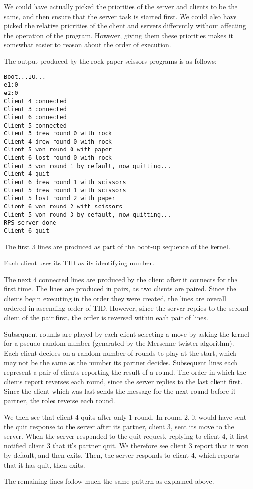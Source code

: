 \documentclass[titlepage]{article}
\begin{document}
We could have actually picked the priorities of the server and clients to be the
same, and then ensure that the server task is started first.
We could also have picked the relative priorities of the client and servers differently
without affecting the operation of the program.
However, giving them these priorities makes it somewhat easier to reason about
the order of execution.

The output produced by the rock-paper-scissors programs is as follows:

\begin{verbatim}
Boot...IO...
e1:0
e2:0
Client 4 connected
Client 3 connected
Client 6 connected
Client 5 connected
Client 3 drew round 0 with rock
Client 4 drew round 0 with rock
Client 5 won round 0 with paper
Client 6 lost round 0 with rock
Client 3 won round 1 by default, now quitting...
Client 4 quit
Client 6 drew round 1 with scissors
Client 5 drew round 1 with scissors
Client 5 lost round 2 with paper
Client 6 won round 2 with scissors
Client 5 won round 3 by default, now quitting...
RPS server done
Client 6 quit
\end{verbatim}

The first 3 lines are produced as part of the boot-up sequence of the kernel.

Each client uses its TID as its identifying number.

The next 4 connected lines are produced by the client after it connects for
the first time.
The lines are produced in pairs, as two clients are paired.
Since the clients begin executing in the order they were created, the lines are
overall ordered in ascending order of TID\@.
However, since the server replies to the second client of the pair first,
the order is reversed within each pair of lines.

Subsequent rounds are played by each client selecting a move by asking the kernel
for a pseudo-random number (generated by the Mersenne twister algorithm).
Each client decides on a random number of rounds to play at the start, which may not
be the same as the number its partner decides.
Subsequent lines each represent a pair of clients reporting the result of a round.
The order in which the clients report reverses each round, since the server replies to
the last client first.
Since the client which was last sends the message for the next round before it partner,
the roles reverse each round.

We then see that client 4 quits after only 1 round.
In round 2, it would have sent the quit response to the server after its partner, client 3,
sent its move to the server.
When the server responded to the quit request, replying to client 4, it first notified client 3
that it's partner quit.
We therefore see client 3 report that it won by default, and then exits.
Then, the server responds to client 4, which reports that it has quit, then exits.

The remaining lines follow much the same pattern as explained above.
\end{document}
